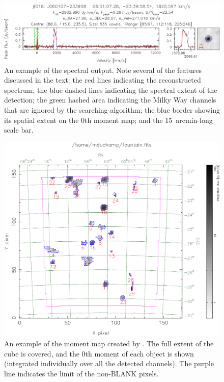 
\begin{figure}[t]
  \begin{center}
    \includegraphics[width=\textwidth]{example_spectrum}
  \end{center}
  \caption{\footnotesize An example of the spectral output. Note several
    of the features discussed in the text: the red lines indicating the
    reconstructed spectrum; the blue dashed lines indicating the
    spectral extent of the detection; the green hashed area indicating
    the Milky Way channels that are ignored by the searching algorithm;
    the blue border showing its spatial extent on the 0th moment map;
    and the 15~arcmin-long scale bar.}
  \label{fig-spect}
\end{figure}

\begin{figure}[!t]
  \begin{center}
    \includegraphics[width=\textwidth]{example_moment_map}
  \end{center}
  \caption{\footnotesize An example of the moment map created by
    \duchamp. The full extent of the cube is covered, and the 0th moment
    of each object is shown (integrated individually over all the
    detected channels). The purple line indicates the limit of the
    non-BLANK pixels.}
  \label{fig-moment}
\end{figure}

